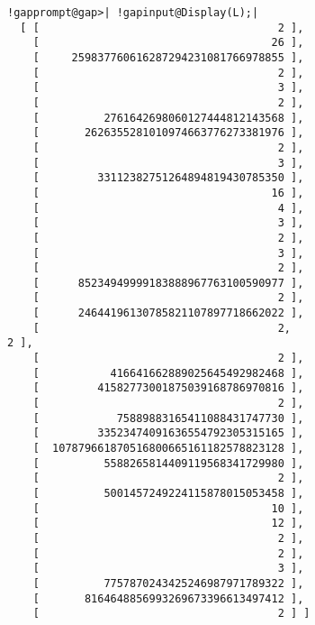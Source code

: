\documentclass[a4paper,11pt]{report}
\begin{document}
{{\begin{Verbatim}[commandchars=!@|,fontsize=\small,frame=single,label=Example]
  !gapprompt@gap>| !gapinput@Display(L);|
  [ [                                     2 ],
    [                                    26 ],
    [     259837760616287294231081766978855 ],
    [                                     2 ],
    [                                     3 ],
    [                                     2 ],
    [          2761642698060127444812143568 ],
    [       2626355281010974663776273381976 ],
    [                                     2 ],
    [                                     3 ],
    [         33112382751264894819430785350 ],
    [                                    16 ],
    [                                     4 ],
    [                                     3 ],
    [                                     2 ],
    [                                     3 ],
    [                                     2 ],
    [      85234949999183888967763100590977 ],
    [                                     2 ],
    [      24644196130785821107897718662022 ],
    [                                     2,                                     2 ],
    [                                     2 ],
    [           416641662889025645492982468 ],
    [         41582773001875039168786970816 ],
    [                                     2 ],
    [            75889883165411088431747730 ],
    [         33523474091636554792305315165 ],
    [  107879661870516800665161182578823128 ],
    [          5588265814409119568341729980 ],
    [                                     2 ],
    [          5001457249224115878015053458 ],
    [                                    10 ],
    [                                    12 ],
    [                                     2 ],
    [                                     2 ],
    [                                     3 ],
    [          7757870243425246987971789322 ],
    [       8164648856993269673396613497412 ],
    [                                     2 ] ]
  
\end{Verbatim}
 }

 }

 
\end{document}
